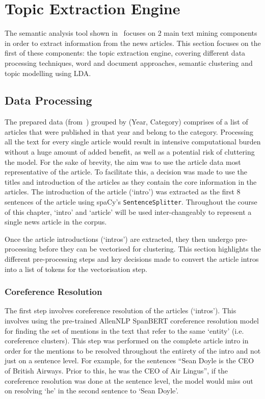 \chapter{Topic Extraction Engine} \label{ch:4:topic}

The semantic analysis tool shown in~ focuses on 2 main text mining components in order to extract information from the news articles. This section focuses on the first of these components: the topic extraction engine, covering different data processing techniques, word and document approaches, semantic clustering and topic modelling using LDA. 

\section{Data Processing} \label{s:procesing_topic_engine}

The prepared data (from~) grouped by (Year, Category) comprises of a list of articles that were published in that year and belong to the category. Processing all the text for every single article would result in intensive computational burden without a huge amount of added benefit, as well as a potential risk of cluttering the model. For the sake of brevity, the aim was to use the article data most representative of the article. To facilitate this, a decision was made to use the titles and introduction of the articles as they contain the core information in the articles. The introduction of the article (`intro') was extracted as the first 8 sentences of the article using spaCy's \texttt{SentenceSplitter}. Throughout the course of this chapter, `intro' and `article' will be used inter-changeably to represent a single news article in the corpus. 

Once the article introductions (`intros') are extracted, they then undergo pre-processing before they can be vectorised for clustering. This section highlights the different pre-processing steps and key decisions made to convert the article intros into a list of tokens for the vectorisation step.

\subsection{Coreference Resolution} \label{coref}
The first step involves coreference resolution of the articles (`intros'). This involves using the pre-trained AllenNLP SpanBERT coreference resolution model for finding the set of mentions in the text that refer to the same `entity' (i.e. coreference clusters). This step was performed on the complete article intro in order for the mentions to be resolved throughout the entirety of the intro and not just on a sentence level. For example, for the sentences ``Sean Doyle is the CEO of British Airways. Prior to this, he was the CEO of Air Lingus'', if the coreference resolution was done at the sentence level, the model would miss out on resolving `he' in the second sentence to `Sean Doyle'.

